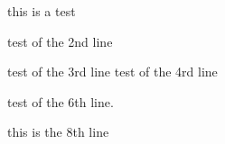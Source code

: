 this is a test

test of the 2nd line

test of the 3rd line
test of the 4rd line

test of the 6th line.


this is the 8th line


